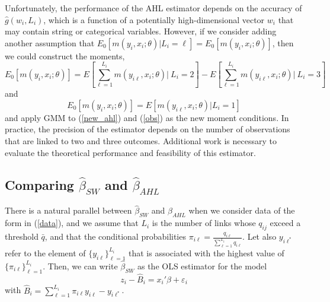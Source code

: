 \documentclass[12pt]{article}
\begin{document}
Unfortunately, the performance of the AHL estimator depends on the accuracy of $\hat{g}(w_i, L_i)$, which is a function of a potentially high-dimensional vector $w_i$ that may contain string or categorical variables.  However, if we consider adding another assumption that $E_0[m(y_i, x_i; \theta) | L_i = \ell] = E_0[m(y_i, x_i; \theta)]$, then we could construct the moments, 
\begin{equation}
E_0[m(y_i, x_i; \theta)] = E\left[\sum_{\ell=1}^{L_i} m(y_{i\ell}, x_i; \theta) \Bigg|\ L_i = 2 \right]  - E\left[ \sum_{\ell=1}^{L_i} m(y_{i\ell}, x_i; \theta) \Bigg|\ L_i = 3\right] \label{new_ahl} \end{equation}
and
\begin{equation}
E_0[m(y_i, x_i; \theta)] = E[m(y_{i\ell}, x_i; \theta) | L_i =1]  \label{obs}
\end{equation}
and apply GMM to (\ref{new_ahl}) and (\ref{obs}) as the new moment conditions.   In practice, the precision of the estimator depends on the number of observations that are linked to two and three outcomes.  Additional work is necessary to evaluate the theoretical performance and feasibility of this estimator.  

\subsection{Comparing $\hat{\beta}_{SW}$ and $\hat{\beta}_{AHL}$}
There is a natural parallel between $\hat{\beta}_{SW}$ and $\hat{\beta}_{AHL}$ when we consider data of the form in (\ref{data}), and we assume that $L_i$ is the number of links whose $q_{ij}$ exceed a threshold $\bar{q}$, and that the conditional probabilities $\pi_{i\ell} = \frac{q_{i\ell}}{\sum_{\ell=1}^{L_{i}} q_{i\ell}}$.  Let also $y_{i\ell^*}$ refer to the element of $\{y_{i\ell}\}_{\ell=1}^{L_i}$ that is associated with the highest value of $\{\pi_{i\ell}\}_{\ell=1}^{L_i}$.  Then, we can write $\hat{\beta}_{SW}$ as the OLS estimator for the model
\begin{equation}
z_i - \hat{B}_i = x_i'\beta + \varepsilon_i 
\label{transformed}
\end{equation}
with $\hat{B}_i = \sum_{\ell =1}^{L_i} \pi_{i\ell} y_{i\ell} - y_{i\ell^*}$.  
\end{document}
